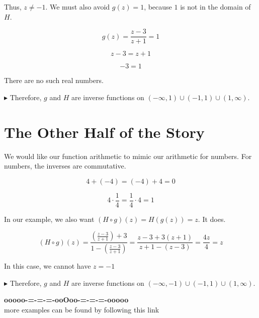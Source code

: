 \documentclass{ximera}
\begin{document}
Thus, $z \ne -1$.  We must also avoid $g(z) = 1$, because $1$ is not in the domain of $H$.



\[
g(z) = \frac{z-3}{z+1} = 1
\]

\[
z - 3 = z + 1 
\]


\[
-3 = 1
\]


There are no such real numbers.













$\blacktriangleright$ Therefore, $g$ and $H$ are inverse functions on $(-\infty, 1) \cup (-1, 1) \cup (1,\infty)$.




















\section*{The Other Half of the Story}


We would like our function arithmetic to mimic our arithmetic for numbers.  For numbers, the inverses are commutative.

\[
4 + (-4) = (-4) + 4 = 0
\]


\[
4 \cdot \frac{1}{4} = \frac{1}{4} \cdot 4 = 1
\]



In our example, we also want $(H \circ g)(z) = H(g(z)) = z$. It does.


\[
(H \circ g)(z) = \frac{\left( \frac{z-3}{z+1} \right) + 3}{1 - \left(  \frac{z-3}{z+1}\right)} = \frac{z-3 + 3(z+1)}{z+1-(z-3)} = \frac{4z}{4} = z
\]


In this case, we cannot have $z = -1$






$\blacktriangleright$  Therefore, $g$ and $H$ are inverse functions on $(-\infty, -1) \cup (-1, 1) \cup (1, \infty)$.
























\begin{center}
\textbf{\textcolor{green!50!black}{ooooo-=-=-=-ooOoo-=-=-=-ooooo}} \\

more examples can be found by following this link\\ 

\end{center}
\end{document}
